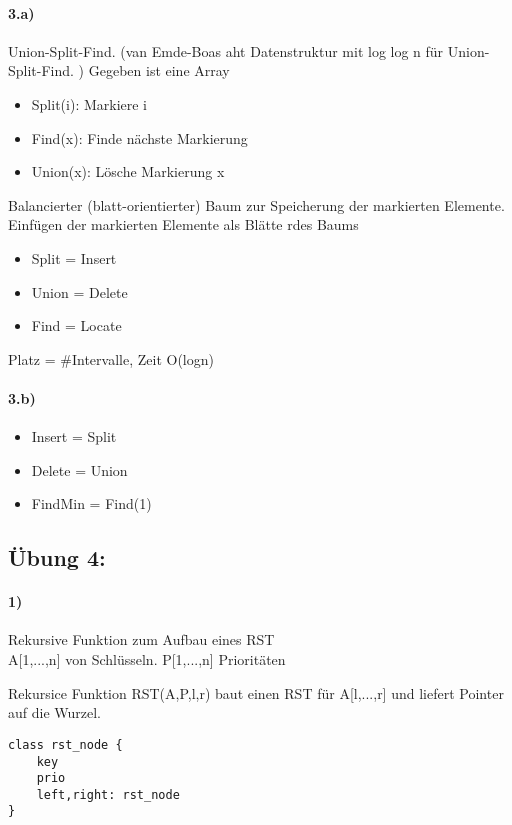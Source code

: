 \paragraph{3.a)} Union-Split-Find. (van Emde-Boas aht Datenstruktur mit log log n für Union-Split-Find. ) Gegeben ist eine Array
\begin{itemize}
    \item Split(i): Markiere i
    \item Find(x): Finde nächste Markierung
    \item Union(x): Lösche Markierung x
\end{itemize}
Balancierter (blatt-orientierter) Baum zur Speicherung der markierten Elemente. Einfügen der markierten Elemente als Blätte rdes Baums
\begin{itemize}
    \item Split = Insert
    \item Union = Delete
    \item Find = Locate
\end{itemize}
Platz = \#Intervalle, Zeit O(logn)
\paragraph{3.b)} 
\begin{itemize}
    \item Insert = Split
    \item Delete = Union
    \item FindMin = Find(1)
\end{itemize}

\subsection*{Übung 4:}
\paragraph{1)} Rekursive Funktion zum Aufbau eines RST \\
A[1,...,n] von Schlüsseln. P[1,...,n] Prioritäten

\begin{algorithm}
\end{algorithm}

Rekursice Funktion RST(A,P,l,r) baut einen RST für A[l,...,r] und liefert Pointer auf die Wurzel.

\begin{verbatim}
class rst_node {
    key
    prio
    left,right: rst_node
}
\end{verbatim}

